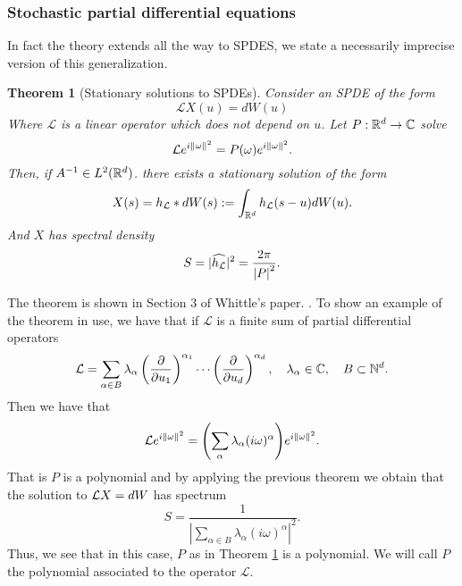 \documentclass[12pt]{article}
\newtheorem{theorem}{Theorem}
\begin{document}
\subsubsection{Stochastic partial differential equations}
In fact the theory extends all the way to SPDES, we state a necessarily imprecise version of this generalization.
\begin{theorem}[Stationary solutions to SPDEs]\label{spde theorem}
    Consider an  SPDE of the form
    \begin{equation}\label{spde}
        \mathcal{L}X(u)=dW(u)
    \end{equation}
    Where $\mathcal{L}$ is a linear operator which does not depend on $u$. Let $P:{\mathbb R}^d\to\mathbb{C}$  solve
    \begin{equation*}
        \mathcal{L}e^{i\norm{\omega}^2}=P(\omega)e^{i\norm{\omega}^2}.
    \end{equation*}
    Then, if $A^{-1}\in L^2({\mathbb R}^d)$. there exists a stationary solution of the form
    \begin{equation*}
        X(s)=h_{\mathcal{L}}*dW(s):=\int_{{\mathbb R}^d} h_{\mathcal{L}}(s-u)dW(u).
    \end{equation*}
    And $X$ has spectral density
    \begin{equation*}
        S={|\widehat{h_\mathcal{L}}|^2}=\frac{2\pi}{\abs{P}^2}.
    \end{equation*}
\end{theorem}
The theorem is shown in Section $3$ of Whittle's paper. \cite{whittle1963stochastic}. To show an example of the theorem in use, we have that if $\mathcal{L}$ is a finite sum of partial differential operators
\begin{equation*}
    \mathcal{L}=\sum_{\alpha\in B} \lambda_\alpha\left(\frac{\partial}{\partial u_1}\right)^{\alpha_1}\cdots \left(\frac{\partial}{\partial u_d}\right)^{\alpha_d},\quad \lambda_{\alpha}\in\mathbb{C},\quad B\subset\mathbb{N}^d.
\end{equation*}
Then we have that
\begin{equation*}
    \mathcal{L}e^{i\norm{\omega}^2}=\qty(\sum_\alpha \lambda_\alpha(i\omega)^\alpha)e^{i\norm{\omega}^2}.
\end{equation*}
That is $P$ is a polynomial and by applying the previous theorem we obtain that the solution to $\mathcal{L} X=dW$ has spectrum
\begin{equation*}
    S=\frac{1}{|\sum_{\alpha\in B}\lambda_\alpha(i\omega)^\alpha|^2}.
\end{equation*}
Thus, we see that in this case, $P$ as in Theorem \ref{spde theorem} is a polynomial. We will call $P$ the polynomial associated to the operator $\mathcal{L}$.
\end{document}
